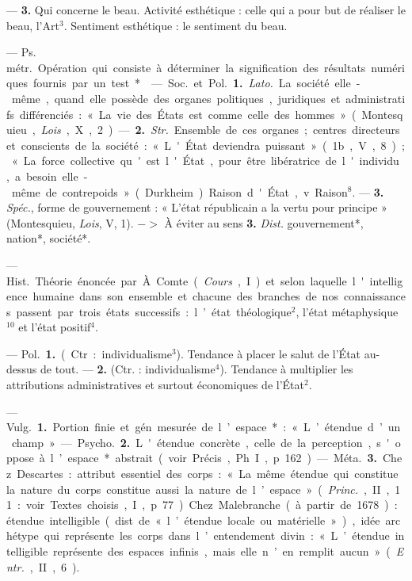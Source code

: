 \begin{itemize}[leftmargin=1cm, label=, itemsep=1pt]
 — {\bf 3.} Qui concerne
le beau. Activité esthétique : celle qui
a pour but de réaliser le beau, l’Art$^3$.
Sentiment esthétique : le sentiment
du beau.

 — \si{Ps. métr.} Opération
qui consiste à déterminer la signification des résultats numériques
fournis par un test*.

 — \si{Soc.} et \si{Pol.} {\bf 1.} {\it Lato.} La société
elle-même, quand elle possède des
organes politiques, juridiques et
administratifs différenciés : « La vie
des États est comme celle des hommes » (Montesquieu, {\it Lois}, X, 2). —
 {\bf 2.} {\it Str.} Ensemble de ces organes;
centres directeurs et conscients de
la société : « L'État deviendra puissant »
(1b., V, 8); « La force collective qu'est l'État, pour être libératrice de l'individu, a besoin elle-même de contrepoids » (Durkheim).
Raison d'État, v. Raison$^8$. — {\bf 3.}
{\it Spéc.}, forme de gouvernement :
« L'état républicain a la vertu pour
principe » (Montesquieu, {\it Lois}, V, 1).
$->$ À éviter au sens {\bf 3.} {\it Dist.} gouvernement*, nation*, société*.

 — \si{Hist.} Théorie
énoncée par À. Comte ({\it Cours}, I) et
selon laquelle l'intelligence humaine
dans son ensemble et chacune des
branches de nos connaissances passent par trois états successifs : l’état
théologique$^2$, l'état métaphysique$^{10}$
et l'état positif$^4$.

 — \si{Pol.} {\bf 1.} (Ctr. : individualisme$^3$). Tendance à placer le salut
de l'État au-dessus de tout. — {\bf 2.}
(Ctr. : individualisme$^4$). Tendance à
multiplier les attributions administratives et surtout économiques de
l'État$^2$.

 — \si{Vulg.} {\bf 1.} Portion finie et
gén. mesurée de l’espace* : « L’étendue d’un champ ».

— \si{Psycho.} {\bf 2.} L'étendue concrète,
celle de la perception, s'oppose à
l’espace* abstrait (voir Précis, Ph. I,
p. 162).

— \si{Méta.} {\bf 3.} Chez Descartes :
attribut essentiel des corps : « La
même étendue qui constitue la nature du corps constitue aussi la
nature de l’espace » ({\it Princ.}, II, 11 :
voir Textes choisis, I, p. 77). Chez
Malebranche (à partir de 1678) :
étendue intelligible (dist. de « l’étendue locale ou matérielle »), idée
archétype qui représente les corps
dans l’entendement divin : « L’étendue intelligible représente des espaces infinis, mais elle n’en remplit
aucun » ({\it Entr.}, II, 6).


\end{itemize}
